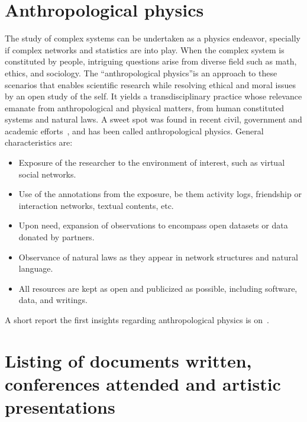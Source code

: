 \begin{apendicesenv}
\section{Anthropological physics}
The study of complex systems can be undertaken as a physics endeavor,
specially if complex networks and statistics are into play. When the complex
system is constituted by people, intriguing questions arise from diverse field such as math, ethics, and sociology. The “anthropological physics”is an approach to these scenarios that enables scientific research while resolving ethical and moral issues by an open study of the self.
	It yields a transdisciplinary practice whose relevance emanate from anthropological
and physical matters, from human constituted systems and natural laws.
A sweet spot was found in recent civil, government and academic efforts~\cite{opa,ensaio}, and has been called anthropological physics. General characteristics are:
\begin{itemize}
	\item Exposure of the researcher to the environment of interest, such as virtual social networks.
	\item Use of the annotations from the exposure, be them activity logs, friendship or interaction networks, textual contents, etc.
	\item Upon need, expansion of observations to encompass open datasets or data donated by partners.
	\item Observance of natural laws as they appear in network structures and natural language.
	\item All resources are kept as open and publicized as possible, including software, data, and writings.
\end{itemize}                                                                                                                                     
A short report the first insights regarding anthropological physics is on~\cite{anPhy}.
 
\section{Listing of documents written, conferences attended and artistic presentations}

\end{apendicesenv}
